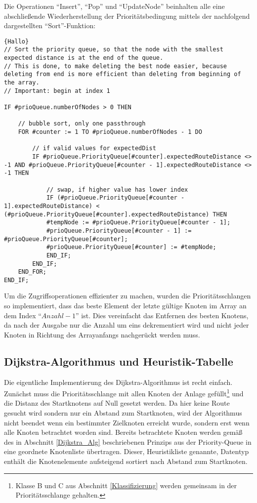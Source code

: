 			Die Operationen "`Insert"', "`Pop"' und "`UpdateNode"' beinhalten alle eine abschließende Wiederherstellung  der Prioritätsbedingung mittels der nachfolgend dargestellten "`Sort"'-Funktion:
			
			\begin{lstlisting}[frame=single]{Hallo}
// Sort the priority queue, so that the node with the smallest expected distance is at the end of the queue.
// This is done, to make deleting the best node easier, because deleting from end is more efficient than deleting from beginning of the array.
// Important: begin at index 1

IF #prioQueue.numberOfNodes > 0 THEN

	// bubble sort, only one passthrough
	FOR #counter := 1 TO #prioQueue.numberOfNodes - 1 DO
	
		// if valid values for expectedDist
		IF #prioQueue.PriorityQueue[#counter].expectedRouteDistance <> -1 AND #prioQueue.PriorityQueue[#counter - 1].expectedRouteDistance <> -1 THEN
		
			// swap, if higher value has lower index
			IF (#prioQueue.PriorityQueue[#counter - 1].expectedRouteDistance) < (#prioQueue.PriorityQueue[#counter].expectedRouteDistance) THEN
			#tempNode := #prioQueue.PriorityQueue[#counter - 1];
			#prioQueue.PriorityQueue[#counter - 1] := #prioQueue.PriorityQueue[#counter];
			#prioQueue.PriorityQueue[#counter] := #tempNode;
			END_IF;
		END_IF;
	END_FOR;
END_IF;		
			\end{lstlisting}
			
			Um die Zugriffsoperationen effizienter zu machen, wurden die Prioritätsschlangen so implementiert, dass das beste Element der letzte gültige Knoten im Array an dem Index "`$Anzahl - 1$"' ist. Dies vereinfacht das Entfernen des besten Knotens, da nach der Ausgabe nur die Anzahl um eins dekrementiert wird und nicht jeder Knoten in Richtung des Arrayanfangs nachgerückt werden muss.
			
		\subsection{Dijkstra-Algorithmus und Heuristik-Tabelle}
			
			Die eigentliche Implementierung des Dijkstra-Algorithmus ist recht einfach. Zunächst muss die Prioritätsschlange mit allen Knoten der Anlage gefüllt\footnote{Klasse B und C aus Abschnitt \ref{Klassifizierung} werden gemeinsam in der Prioritätsschlange gehalten.} und die Distanz des Startknotens auf Null gesetzt werden. 
			Da hier keine Route gesucht wird sondern nur ein Abstand zum Startknoten, wird der Algorithmus nicht beendet wenn ein bestimmter Zielknoten erreicht wurde, sondern erst wenn alle Knoten betrachtet worden sind. Bereits betrachtete Knoten werden gemäß des in Abschnitt \ref{Dijkstra_Alg} beschriebenen Prinzips aus der Priority-Queue in eine geordnete Knotenliste übertragen. Dieser, Heuristikliste genannte, Datentyp enthält die Knotenelemente aufsteigend sortiert nach Abstand zum Startknoten.
			
